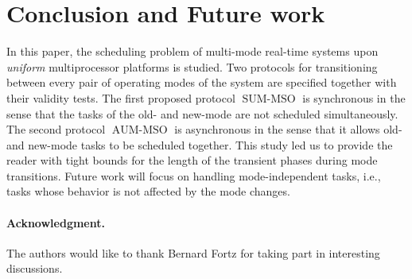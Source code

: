 \documentclass[10pt,english,a4paper]{article}
\newtheorem{validity test}{Validity Test}
\newcommand{\SUMMSO}{\operatorname{SUM-MSO}}
\newcommand{\AUMMSO}{\operatorname{AUM-MSO}}
\begin{document}
\section{Conclusion and Future work}\label{Conclusion and future work}

In this paper, the scheduling problem of multi-mode real-time systems upon {\em uniform} multiprocessor platforms is studied. Two protocols for transitioning between every pair of operating modes of the system are specified together with their validity tests. The first proposed protocol $\SUMMSO$ is synchronous in the sense that the tasks of the old- and new-mode are not scheduled simultaneously. The second protocol $\AUMMSO$ is asynchronous in the sense that it allows old- and new-mode tasks to be scheduled together. This study led us to provide the reader with tight bounds for the length of the transient phases during mode transitions. Future work will focus on handling mode-independent tasks, i.e., tasks whose behavior is not affected by the mode changes. \\
\vspace{-0.3cm}

\paragraph{Acknowledgment.} The authors would like to thank Bernard Fortz for taking part in interesting discussions.



\end{document}
